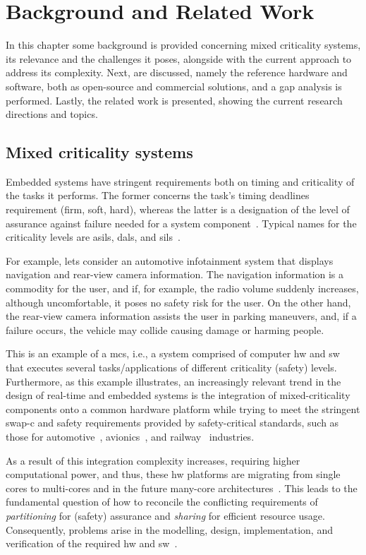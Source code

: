 %
\chapter{Background and Related Work}%
\label{ch:state-art}
In this chapter some background is provided concerning mixed criticality
systems, its relevance and the challenges it poses, alongside with the current
approach to address its complexity. Next,  are discussed,
namely the reference hardware and software, both as open-source and commercial
solutions, and a gap analysis is performed. Lastly, the related work is
presented, showing the current research directions and topics.

\section{Mixed criticality systems}%
\label{sec:mixed-crit-syst}
Embedded systems have stringent requirements both on timing and criticality of
the tasks it performs. The former concerns the task's timing deadlines
requirement (firm, soft, hard), whereas the latter is a
designation of the level of assurance against failure needed for a system
component~\cite{burns2022mixed}. Typical names for the criticality levels are
\glspl{asil}, \glspl{dal}, and \glspl{sil}~\cite{burns2022mixed}.

For example, lets consider an automotive infotainment system that displays
navigation and rear-view camera information. The navigation information is a
commodity for the user, and if, for example, the radio volume suddenly
increases, although uncomfortable, it poses no safety risk for the user. On the
other hand, the rear-view camera information assists the user in parking
maneuvers, and, if a failure occurs, the vehicle may collide causing damage or
harming people.

This is an example of a \gls{mcs}, i.e., a system comprised of computer
\gls{hw} and \gls{sw} that executes several tasks/applications of different
criticality (safety) levels. Furthermore, as this example illustrates, an increasingly relevant trend in the design of real-time and embedded systems
is the integration of mixed-criticality components onto a common hardware
platform while trying to meet the stringent \gls{swap-c} and safety requirements
provided by safety-critical standards, such as those for automotive~\cite{iso26262}, avionics~\cite{rtca1992software},
and railway~\cite{cenelec201250128} industries.

As a result of this integration
complexity increases, requiring higher computational power, and thus, these
\gls{hw} platforms are migrating from single cores to multi-cores and in the
future many-core architectures~\cite{burns2022mixed}. This leads to the
fundamental question of how to reconcile the
conflicting requirements of \emph{partitioning} for (safety) assurance and \emph{sharing} for
efficient resource usage. Consequently, problems arise in the modelling, design,
implementation, and verification of the required \gls{hw} and
\gls{sw}~\cite{burns2022mixed}.

